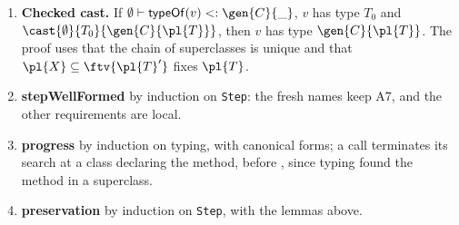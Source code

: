 \begin{enumerate}
\item \textbf{Checked cast.} If $\emptyset\vdash\mathsf{typeOf}(v)<:\gen{C}{\_}$, $v$ has type $T_0$ and $\cast{\emptyset}{T_0}{\gen{C}{\pl{T}}}$, then $v$ has type $\gen{C}{\pl{T}}$.
The proof uses that the chain of superclasses is unique and that $\pl{X}\subseteq\ftv{\pl{T}'}$ fixes $\pl{T}$.
\item \textbf{stepWellFormed} by induction on \texttt{Step}: the fresh names keep A7, and the other requirements are local.
\item \textbf{progress} by induction on typing, with canonical forms; a call terminates its search at a class declaring the method, before \Q@Object@, since typing found the method in a superclass.
\item \textbf{preservation} by induction on \texttt{Step}, with the lemmas above.
\end{enumerate}

